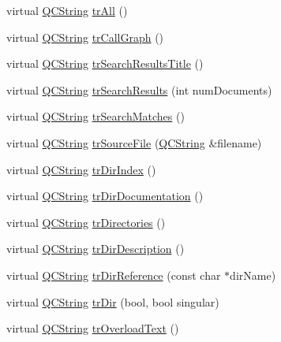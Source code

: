 \begin{DoxyCompactItemize}
virtual \mbox{\hyperlink{class_q_c_string}{Q\+C\+String}} \mbox{\hyperlink{class_translator_persian_ae3b273833467e4dfb2144066efaaca1d}{tr\+All}} ()
\item 
virtual \mbox{\hyperlink{class_q_c_string}{Q\+C\+String}} \mbox{\hyperlink{class_translator_persian_aa526db6e935668d1daa7c0a9c4ceb8b8}{tr\+Call\+Graph}} ()
\item 
virtual \mbox{\hyperlink{class_q_c_string}{Q\+C\+String}} \mbox{\hyperlink{class_translator_persian_a3193c6847115a6384ac397f6df616897}{tr\+Search\+Results\+Title}} ()
\item 
virtual \mbox{\hyperlink{class_q_c_string}{Q\+C\+String}} \mbox{\hyperlink{class_translator_persian_a7c30592c6e6a397917891053fd0a62f3}{tr\+Search\+Results}} (int num\+Documents)
\item 
virtual \mbox{\hyperlink{class_q_c_string}{Q\+C\+String}} \mbox{\hyperlink{class_translator_persian_a1f7b1920aac1412ab5f5bb99e4eb8bf1}{tr\+Search\+Matches}} ()
\item 
virtual \mbox{\hyperlink{class_q_c_string}{Q\+C\+String}} \mbox{\hyperlink{class_translator_persian_a7dca0aca24a6c2c76760fb85e95a1b9a}{tr\+Source\+File}} (\mbox{\hyperlink{class_q_c_string}{Q\+C\+String}} \&filename)
\item 
virtual \mbox{\hyperlink{class_q_c_string}{Q\+C\+String}} \mbox{\hyperlink{class_translator_persian_a20accdb49d53063a089c569419215b4e}{tr\+Dir\+Index}} ()
\item 
virtual \mbox{\hyperlink{class_q_c_string}{Q\+C\+String}} \mbox{\hyperlink{class_translator_persian_a3100df4d9e74a6ae67a17f70268caaf2}{tr\+Dir\+Documentation}} ()
\item 
virtual \mbox{\hyperlink{class_q_c_string}{Q\+C\+String}} \mbox{\hyperlink{class_translator_persian_a8c198763218e8e9a6f391f409e1146f5}{tr\+Directories}} ()
\item 
virtual \mbox{\hyperlink{class_q_c_string}{Q\+C\+String}} \mbox{\hyperlink{class_translator_persian_a1e906fbdd8542727e85517dde013d53b}{tr\+Dir\+Description}} ()
\item 
virtual \mbox{\hyperlink{class_q_c_string}{Q\+C\+String}} \mbox{\hyperlink{class_translator_persian_a6155500222ad9ad5047c8933dc290dfe}{tr\+Dir\+Reference}} (const char $\ast$dir\+Name)
\item 
virtual \mbox{\hyperlink{class_q_c_string}{Q\+C\+String}} \mbox{\hyperlink{class_translator_persian_a7ed31c1aaa90edc6cceb4ab37c873462}{tr\+Dir}} (bool, bool singular)
\item 
virtual \mbox{\hyperlink{class_q_c_string}{Q\+C\+String}} \mbox{\hyperlink{class_translator_persian_a8e0b7cf24f2cf4b77158904941cfe4f8}{tr\+Overload\+Text}} ()

\end{DoxyCompactItemize}
